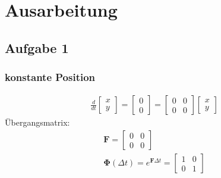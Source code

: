 \chapter{Ausarbeitung}
\section{Aufgabe 1}
\subsection{konstante Position}
\begin{gather}
	\frac{d}{dt}\begin{bmatrix}
	x \\
	y
	\end{bmatrix} = \begin{bmatrix}
	0 \\
	0
	\end{bmatrix} = \begin{bmatrix}
	0 & 0 \\
	0 & 0
	\end{bmatrix} \begin{bmatrix}
	x \\
	y
	\end{bmatrix}
\end{gather}
Übergangsmatrix:
\begin{gather}
	\bm{F} = \begin{bmatrix}
	0 & 0 \\
	0 & 0
	\end{bmatrix} \\
	\bm{\Phi}(\Delta t) = e^{\bm{F}\Delta t} =\begin{bmatrix}
	1 & 0 \\
	0 & 1
	\end{bmatrix}
\end{gather}
